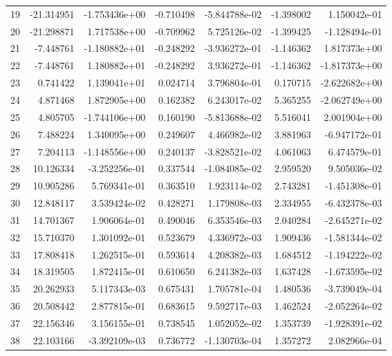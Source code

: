 \begin{tabular}{rrrrrrr}
19 & -21.314951 & -1.753436e+00 & -0.710498 & -5.844788e-02 &   -1.398002 &  1.150042e-01 \\
20 & -21.298871 &  1.717538e+00 & -0.709962 &  5.725126e-02 &   -1.399425 & -1.128494e-01 \\
21 &  -7.448761 & -1.180882e+01 & -0.248292 & -3.936272e-01 &   -1.146362 &  1.817373e+00 \\
22 &  -7.448761 &  1.180882e+01 & -0.248292 &  3.936272e-01 &   -1.146362 & -1.817373e+00 \\
23 &   0.741422 &  1.139041e+01 &  0.024714 &  3.796804e-01 &    0.170715 & -2.622682e+00 \\
24 &   4.871468 &  1.872905e+00 &  0.162382 &  6.243017e-02 &    5.365255 & -2.062749e+00 \\
25 &   4.805705 & -1.744106e+00 &  0.160190 & -5.813688e-02 &    5.516041 &  2.001904e+00 \\
26 &   7.488224 &  1.340095e+00 &  0.249607 &  4.466982e-02 &    3.881963 & -6.947172e-01 \\
27 &   7.204113 & -1.148556e+00 &  0.240137 & -3.828521e-02 &    4.061063 &  6.474579e-01 \\
28 &  10.126334 & -3.252256e-01 &  0.337544 & -1.084085e-02 &    2.959520 &  9.505036e-02 \\
29 &  10.905286 &  5.769341e-01 &  0.363510 &  1.923114e-02 &    2.743281 & -1.451308e-01 \\
30 &  12.848117 &  3.539424e-02 &  0.428271 &  1.179808e-03 &    2.334955 & -6.432378e-03 \\
31 &  14.701367 &  1.906064e-01 &  0.490046 &  6.353546e-03 &    2.040284 & -2.645271e-02 \\
32 &  15.710370 &  1.301092e-01 &  0.523679 &  4.336972e-03 &    1.909436 & -1.581344e-02 \\
33 &  17.808418 &  1.262515e-01 &  0.593614 &  4.208382e-03 &    1.684512 & -1.194222e-02 \\
34 &  18.319505 &  1.872415e-01 &  0.610650 &  6.241382e-03 &    1.637428 & -1.673595e-02 \\
35 &  20.262933 &  5.117343e-03 &  0.675431 &  1.705781e-04 &    1.480536 & -3.739049e-04 \\
36 &  20.508442 &  2.877815e-01 &  0.683615 &  9.592717e-03 &    1.462524 & -2.052264e-02 \\
37 &  22.156346 &  3.156155e-01 &  0.738545 &  1.052052e-02 &    1.353739 & -1.928391e-02 \\
38 &  22.103166 & -3.392109e-03 &  0.736772 & -1.130703e-04 &    1.357272 &  2.082966e-04 \\

\end{tabular}
